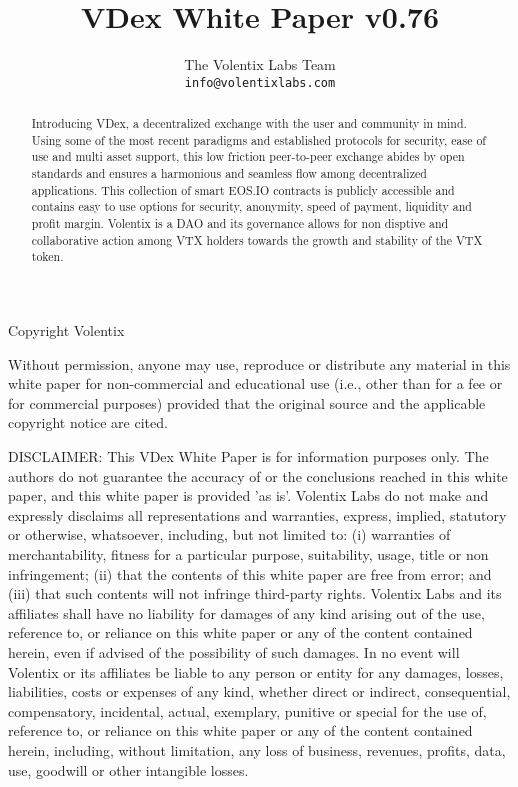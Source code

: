 \documentclass[]{article}
\title{VDex White Paper v0.76}
\author{
		The Volentix Labs Team\\
	\texttt{info@volentixlabs.com}
}
\begin{document}
\tableofcontents
\maketitle
\begin{description}
\item Copyright  Volentix
\end{description}

{\tiny Without permission, anyone may use, reproduce or distribute any material in this white paper for non-commercial and educational use (i.e., other than for a fee or for commercial purposes) provided that the original source and the applicable copyright notice are cited.

DISCLAIMER: This VDex White Paper  is for information purposes only. The authors do not guarantee the accuracy of or the conclusions reached in this white paper, and this white paper is provided 'as is'. 
Volentix Labs do not make and expressly disclaims all representations and warranties, express, implied, statutory or otherwise, whatsoever, including, but not limited to: 
(i) warranties of merchantability, fitness for a particular purpose, suitability, usage, title or non infringement; (ii) that the contents of this white paper are free from error; and (iii) that such contents will not infringe third-party rights. Volentix Labs and its affiliates shall have no liability for damages of any kind arising out of the use, reference to, or reliance on this white paper or any of the content contained herein, even if advised of the possibility of such damages. In no event will Volentix or its affiliates be liable to any person or entity for any damages, losses, liabilities, costs or expenses of any kind, whether direct or indirect, consequential, compensatory, incidental, actual, exemplary, punitive or special for the use of, reference to, or reliance on this white paper or any of the content contained herein, including, without limitation, any loss of business, revenues, profits, data, use, goodwill or other intangible losses.}

\begin{abstract}

Introducing VDex, a decentralized exchange with the user and community in mind. 
Using some of the most recent paradigms and established protocols for security, 
ease of use and multi asset support, this low friction peer-to-peer exchange 
abides by open standards and ensures a harmonious and seamless flow among 
decentralized applications. This collection of smart EOS.IO contracts is publicly accessible 
and contains easy to use options for security, anonymity, speed of payment, liquidity and profit margin.
Volentix is a DAO and its governance allows for non disptive and collaborative action among VTX holders towards the growth and stability of the VTX token.
\end{abstract}
\end{document}
